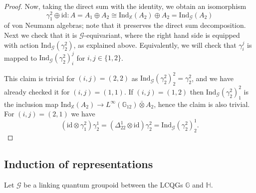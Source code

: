 \documentclass[reqno]{amsart}
\numberwithin{equation}{section}
\newcommand{\id}{\mathrm{id}}
\newcommand{\G}{\mathbb{G}}
\newcommand{\Hh}{\mathbb{H}}
\newcommand{\X}{\mathbb{X}}
\newcommand{\msG}{\mathscr{G}}
\newcommand{\Ind}{\mathrm{Ind}}
\begin{document}
\begin{proof}
Now, taking the direct sum with the identity, we obtain an isomorphism 
\[
\gamma^2_1\oplus\id\colon A=A_1\oplus A_2\cong \Ind_{\X}(A_2)\oplus A_2 = \Ind_{\msG}(A_2)
\] 
of von Neumann algebras; note that it preserves the direct sum decomposition. Next we check that it is $\msG$-equivariant, where the right hand side is equipped with action $\Ind_{\msG}(\gamma_2^2)$, as explained above. Equivalently, we will check that $\gamma_i^j$ is mapped to $\Ind_{\msG}(\gamma_2^2)_i^j$ for $i,j\in \{1,2\}$.

This claim is trivial for $(i,j)=(2,2)$ as $\Ind_{\msG}(\gamma_2^2)^2_2=\gamma^2_2$, and we have already checked it for $(i,j)=(1,1)$. If $(i,j)=(1,2)$ then $\Ind_{\msG}(\gamma^2_2)_1^2$ is the inclusion map $\Ind_{\X}(A_2)\rightarrow L^{\infty}(\G_{12})\bar\otimes A_2$, hence the claim is also trivial. For $(i,j)=(2,1)$ we have
\[
(\id\otimes \gamma^2_1)\gamma_2^1=
(\Delta^1_{22}\otimes\id)\gamma^2_2=\Ind_{\msG}(\gamma_2^2)^1_2.
\]
\end{proof}

\subsection{Induction of representations} 

Let $\msG$ be a linking quantum groupoid between the LCQGs $\G$ and $\Hh$. 
\end{document}
